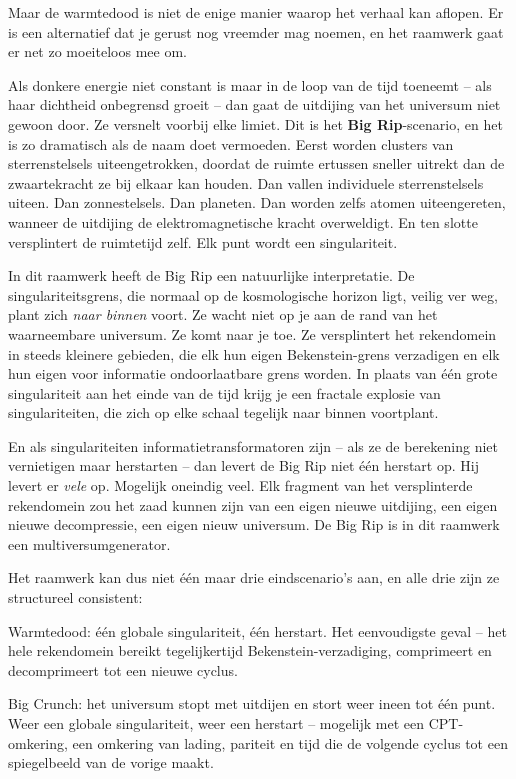 \documentclass[11pt, twoside, openright]{book}
\begin{document}
Maar de warmtedood is niet de enige manier waarop het verhaal kan aflopen. Er is een alternatief dat je gerust nog vreemder mag noemen, en het raamwerk gaat er net zo moeiteloos mee om.

Als donkere energie niet constant is maar in de loop van de tijd toeneemt -- als haar dichtheid onbegrensd groeit -- dan gaat de uitdijing van het universum niet gewoon door. Ze versnelt voorbij elke limiet. Dit is het \textbf{Big Rip}-scenario, en het is zo dramatisch als de naam doet vermoeden. Eerst worden clusters van sterrenstelsels uiteengetrokken, doordat de ruimte ertussen sneller uitrekt dan de zwaartekracht ze bij elkaar kan houden. Dan vallen individuele sterrenstelsels uiteen. Dan zonnestelsels. Dan planeten. Dan worden zelfs atomen uiteengereten, wanneer de uitdijing de elektromagnetische kracht overweldigt. En ten slotte versplintert de ruimtetijd zelf. Elk punt wordt een singulariteit.

In dit raamwerk heeft de Big Rip een natuurlijke interpretatie. De singulariteitsgrens, die normaal op de kosmologische horizon ligt, veilig ver weg, plant zich \textit{naar binnen} voort. Ze wacht niet op je aan de rand van het waarneembare universum. Ze komt naar je toe. Ze versplintert het rekendomein in steeds kleinere gebieden, die elk hun eigen Bekenstein-grens verzadigen en elk hun eigen voor informatie ondoorlaatbare grens worden. In plaats van één grote singulariteit aan het einde van de tijd krijg je een fractale explosie van singulariteiten, die zich op elke schaal tegelijk naar binnen voortplant.

En als singulariteiten informatietransformatoren zijn -- als ze de berekening niet vernietigen maar herstarten -- dan levert de Big Rip niet één herstart op. Hij levert er \textit{vele} op. Mogelijk oneindig veel. Elk fragment van het versplinterde rekendomein zou het zaad kunnen zijn van een eigen nieuwe uitdijing, een eigen nieuwe decompressie, een eigen nieuw universum. De Big Rip is in dit raamwerk een multiversumgenerator.

Het raamwerk kan dus niet één maar drie eindscenario's aan, en alle drie zijn ze structureel consistent:

Warmtedood: één globale singulariteit, één herstart. Het eenvoudigste geval -- het hele rekendomein bereikt tegelijkertijd Bekenstein-verzadiging, comprimeert en decomprimeert tot een nieuwe cyclus.

Big Crunch: het universum stopt met uitdijen en stort weer ineen tot één punt. Weer een globale singulariteit, weer een herstart -- mogelijk met een CPT-omkering, een omkering van lading, pariteit en tijd die de volgende cyclus tot een spiegelbeeld van de vorige maakt.
\end{document}

